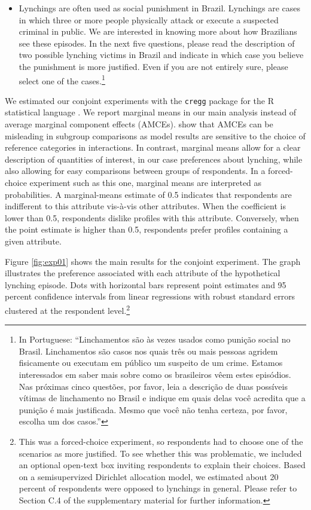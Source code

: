 \documentclass[12pt,a4paper]{article}
\providecommand{\tightlist}{%
   \setlength{\itemsep}{0pt}\setlength{\parskip}{0pt}}
\begin{document}
\begin{itemize}
\tightlist
\item
  Lynchings are often used as social punishment in Brazil. Lynchings are cases in which three or more people physically attack or execute a suspected criminal in public. We are interested in knowing more about how Brazilians see these episodes. In the next five questions, please read the description of two possible lynching victims in Brazil and indicate in which case you believe the punishment is more justified. Even if you are not entirely sure, please select one of the cases.\footnote{In Portuguese: ``Linchamentos são às vezes usados como punição social no Brasil. Linchamentos são casos nos quais três ou mais pessoas agridem fisicamente ou executam em público um suspeito de um crime. Estamos interessados em saber mais sobre como os brasileiros vêem estes episódios. Nas próximas cinco questões, por favor, leia a descrição de duas possíveis vítimas de linchamento no Brasil e indique em quais delas você acredita que a punição é mais justificada. Mesmo que você não tenha certeza, por favor, escolha um dos casos.''}
\end{itemize}

We estimated our conjoint experiments with the \texttt{cregg} package \citep{leeper2018cregg} for the R statistical language \citep{rstats2019}. We report marginal means in our main analysis instead of average marginal component effects (AMCEs). \citet{leeper2018subgroup} show that AMCEs can be misleading in subgroup comparisons as model results are sensitive to the choice of reference categories in interactions. In contrast, marginal means allow for a clear description of quantities of interest, in our case preferences about lynching, while also allowing for easy comparisons between groups of respondents. In a forced-choice experiment such as this one, marginal means are interpreted as probabilities. A marginal-means estimate of 0.5 indicates that respondents are indifferent to this attribute vis-à-vis other attributes. When the coefficient is lower than 0.5, respondents dislike profiles with this attribute. Conversely, when the point estimate is higher than 0.5, respondents prefer profiles containing a given attribute.

Figure \ref{fig:exp01} shows the main results for the conjoint experiment. The graph illustrates the preference associated with each attribute of the hypothetical lynching episode. Dots with horizontal bars represent point estimates and 95 percent confidence intervals from linear regressions with robust standard errors clustered at the respondent level.\footnote{This was a forced-choice experiment, so respondents had to choose one of the scenarios as more justified. To see whether this was problematic, we included an optional open-text box inviting respondents to explain their choices. Based on a semisupervized Dirichlet allocation model, we estimated about 20 percent of respondents were opposed to lynchings in general. Please refer to Section C.4 of the supplementary material for further information.}
\end{document}
